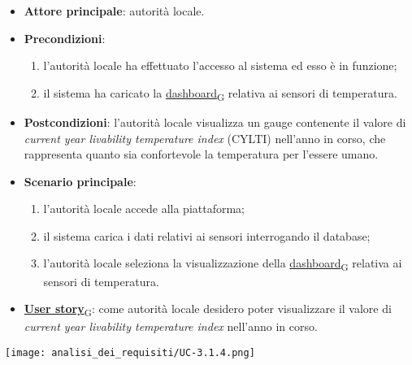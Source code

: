 \newpage
{}
\begin{itemize}
	\item \textbf{Attore principale}: autorità locale.
	\item \textbf{Precondizioni}:
	      \begin{enumerate}
		      \item l'autorità locale ha effettuato l'accesso al sistema ed esso è in funzione;
		      \item il sistema ha caricato la \href{https://7last.github.io/docs/pb/documentazione-interna/glossario\#dashboard}{dashboard\textsubscript{G}} relativa ai sensori di temperatura.
	      \end{enumerate}
	\item \textbf{Postcondizioni}: l'autorità locale visualizza un gauge contenente il valore di \textit{current year livability temperature index} (CYLTI) nell'anno in corso, che rappresenta quanto sia confortevole la temperatura per l'essere umano.
	\item \textbf{Scenario principale}:
	      \begin{enumerate}
		      \item l'autorità locale accede alla piattaforma;
		      \item il sistema carica i dati relativi ai sensori interrogando il database;
		      \item l'autorità locale seleziona la visualizzazione della \href{https://7last.github.io/docs/pb/documentazione-interna/glossario\#dashboard}{dashboard\textsubscript{G}} relativa ai sensori di temperatura.
	      \end{enumerate}
	\item \href{https://7last.github.io/docs/pb/documentazione-interna/glossario\#user-story}{\textbf{User story}\textsubscript{G}}:
	      come autorità locale desidero poter visualizzare il valore di \textit{current year livability temperature index} nell'anno in corso.
\end{itemize}
\begin{center}
	\texttt{[image: analisi\_dei\_requisiti/UC-3.1.4.png]}
\end{center}

